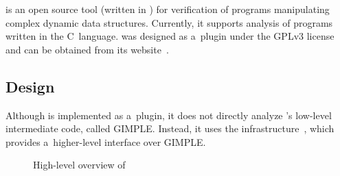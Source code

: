 {\forester is an open source tool (written in \cpp) for verification of programs
manipulating complex dynamic data structures.
Currently, it supports analysis of programs written in the C~language.
\forester was designed as a~\gcc plugin under the GPLv3 license
and can be obtained from its website~\cite{foresterweb}.%


\subsection{Design}

Although \forester is implemented as a~\gcc plugin, it does not directly
analyze \gcc's low-level intermediate code, called GIMPLE.
Instead, it uses the \codelistener infrastructure~\cite{cl11},
which provides a~higher-level interface over GIMPLE.

\begin{figure}[t]
	\begin{center}
		
	\end{center}
	\caption{High-level overview of \forester}
	\label{fig:fa_exec}
\end{figure}


}
